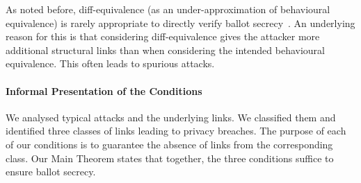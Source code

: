  As noted before, diff-equivalence (as an under-approximation of behavioural
equivalence) is rarely appropriate to directly verify ballot secrecy~\cite{vote-CSF16,surveyJLAMP16}.
An underlying reason for this is that considering diff-equivalence gives the
attacker more additional structural links than when considering the intended
behavioural equivalence. This often leads to spurious attacks.


\paragraph{\textbf{Informal Presentation of the Conditions}}
We %
analysed typical attacks and the underlying links. We classified them
and identified three classes of links leading to privacy breaches.
The purpose of each of our conditions is to guarantee the absence of links from the corresponding class.
Our Main Theorem states that together, the three conditions suffice to
ensure ballot secrecy.

